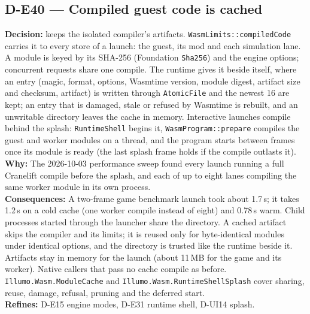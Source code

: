 \subsection*{D-E40 --- Compiled guest code is cached}
\begin{decisionbox}[title={D-E40 \quad 2026-10-03}]
\textbf{Decision:}  keeps the isolated compiler's
artifacts. \texttt{WasmLimits::compiledCode} carries it to every store of a
launch: the guest, its mod and each simulation lane. A module is keyed by its
SHA-256 (Foundation \texttt{Sha256}) and the engine options; concurrent
requests share one compile. The runtime gives it  beside
itself, where an entry (magic, format, options, Wasmtime version, module
digest, artifact size and checksum, artifact) is written through
\texttt{AtomicFile} and the newest 16 are kept; an entry that is damaged,
stale or refused by Wasmtime is rebuilt, and an unwritable directory leaves
the cache in memory. Interactive launches compile behind the splash:
\texttt{RuntimeShell} begins it, \texttt{WasmProgram::prepare} compiles the
guest and worker modules on a thread, and the program starts between frames
once its module is ready (the last splash frame holds if the compile outlasts
it).\\
\textbf{Why:} The 2026-10-03 performance sweep found every launch running a
full Cranelift compile before the splash, and each of up to eight lanes
compiling the same worker module in its own process.\\
\textbf{Consequences:} A two-frame game benchmark launch took about 1.7\,s;
it takes 1.2\,s on a cold cache (one worker compile instead of eight) and
0.78\,s warm. Child processes started through the launcher share the
directory. A cached artifact skips the compiler and its limits; it is reused
only for byte-identical modules under identical options, and the directory
is trusted like the runtime beside it. Artifacts stay in memory for the
launch (about 11\,MB for the game and its worker). Native callers that pass
no cache compile as before. \texttt{Illumo.Wasm.ModuleCache} and
\texttt{Illumo.Wasm.RuntimeShellSplash} cover sharing, reuse, damage, refusal,
pruning and the deferred start.\\
\textbf{Refines:} D-E15 engine modes, D-E31 runtime shell, D-UI14 splash.
\end{decisionbox}

